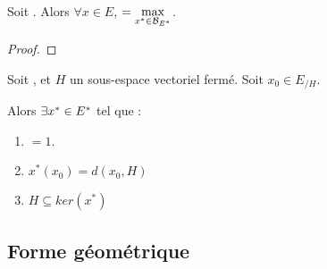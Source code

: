 \begin{corollary}
	Soit . Alors $\forall x \in E$,  
	$ = \max\limits_{x^{*} \in \mathcal{B}_{E^{*}}}$.
\end{corollary}

\begin{proof}
	
\end{proof}

\begin{corollary}
	Soit , et $H$ un sous-espace vectoriel fermé.
	Soit $x_{0} \in E_{/H}$.

	Alors $\exists x^{*} \in E^{*}$ tel que :

	\begin{enumerate}
		\item {} $ = 1$.
		\item $x^{*}(x_{0}) = d(x_{0}, H)$
		\item $H \subseteq ker(x^{*})$
	\end{enumerate}
\end{corollary}

\subsection{Forme géométrique}

